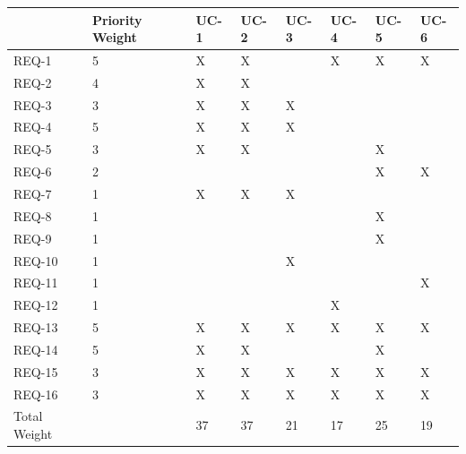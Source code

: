\documentclass[letterpaper,english, 12pt]{scrreprt}
\begin{document}
\renewcommand{\arraystretch}{0.4}
\begin{center}
        \begin{tabular}{|C{1cm}|C{1cm}|C{1cm}|C{1cm}|C{1cm}|C{1cm}|C{1cm}|C{1cm}|}
                \hline
                         & Priority Weight & UC-1 & UC-2 & UC-3 & UC-4 & UC-5 & UC-6 \\
                \hline
                        REQ-1 & 5 & X & X & & X & X & X  \\
                \hline
                        REQ-2 & 4 & X & X & & & &  \\
                \hline
                        REQ-3 & 3 & X & X & X  & & &  \\
                \hline
                        REQ-4 & 5 & X & X & X & & & \\
                \hline
                        REQ-5 & 3 & X & X & & & X & \\
                \hline
                        REQ-6 & 2 & & & & & X & X \\ %
                \hline
                        REQ-7 & 1 & X & X & X & & &  \\
                \hline
                        REQ-8 & 1 & & & & & X  &  \\
                \hline
                        REQ-9 & 1 & & & & & X &  \\
                \hline
                        REQ-10 & 1 & & & X & & &  \\
                \hline
                        REQ-11 & 1 & & & & & & X  \\
		\hline	
			REQ-12 & 1 & & & & X & & \\
                \hline
                        REQ-13 & 5 & X & X & X & X & X & X  \\
                \hline
                        REQ-14 & 5 & X & X & & & X &   \\
                \hline
                        REQ-15 & 3 & X & X & X & X & X & X  \\
                \hline
                        REQ-16 & 3 & X & X & X & X & X & X  \\
                \hline
                        Total Weight & & 37 & 37 & 21 & 17 & 25 & 19  \\
                \hline
        \end{tabular}
\end{center}
\end{document}
